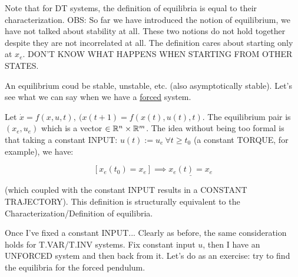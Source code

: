 Note that for DT systems, the definition of equilibria is equal to their characterization.
OBS: So far we have introduced the notion of equilibrium, we have not talked about stability at all. These two notions do not hold together despite they are not incorrelated at all. The definition cares about starting only at $x_e$. DON'T KNOW WHAT HAPPENS WHEN STARTING FROM OTHER STATES. 

An equilibrium coud be stable, unstable, etc. (also asymptotically stable). Let's see what we can say when we have a \underline{forced} system. 

Let $\dot{x}=f(x,u,t),\ (x(t+1) = f(x(t),u(t),t)$. The equilibrium pair is $(x_e,u_e)$ which is a vector $\in \mathbb{R}^n \times \mathbb{R}^m$. The idea without being too formal is that taking a constant INPUT: $u(t) := u_e\ \forall t \geq t_0$ (a constant TORQUE, for example), we have: 

\[
	[x_e(t_0) = x_e] \implies \underline{x_e(t) = x_e}
\]

(which coupled with the constant INPUT results in a CONSTANT TRAJECTORY). This definition is structurally equivalent to the Characterization/Definition of equilibria.

Once I've fixed a constant INPUT... Clearly as before, the same consideration holds for T.VAR/T.INV systems. Fix constant input $u$, then I have an UNFORCED system and then back from it.
Let's do as an exercise: try to find the equilibria for the forced pendulum.